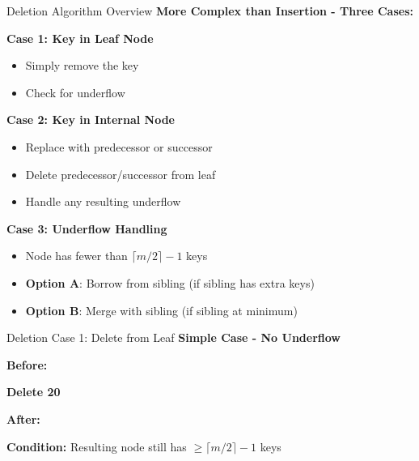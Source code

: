 \documentclass[aspectratio=169]{beamer}
\begin{document}
\begin{frame}{Deletion Algorithm Overview}
  \textbf{More Complex than Insertion - Three Cases:}

  \vspace{0.3cm}
  \textbf{Case 1: Key in Leaf Node}
  \begin{itemize}
    \item Simply remove the key
    \item Check for underflow
  \end{itemize}

  \vspace{0.3cm}
  \textbf{Case 2: Key in Internal Node}
  \begin{itemize}
    \item Replace with predecessor or successor
    \item Delete predecessor/successor from leaf
    \item Handle any resulting underflow
  \end{itemize}

  \vspace{0.3cm}
  \textbf{Case 3: Underflow Handling}
  \begin{itemize}
    \item Node has fewer than $\lceil m/2 \rceil - 1$ keys
    \item \textbf{Option A}: Borrow from sibling (if sibling has extra keys)
    \item \textbf{Option B}: Merge with sibling (if sibling at minimum)
  \end{itemize}
\end{frame}

\begin{frame}{Deletion Case 1: Delete from Leaf}
  \textbf{Simple Case - No Underflow}

  \vspace{0.3cm}
  \textbf{Before:}
  \begin{center}
  \end{center}

  \vspace{0.2cm}
  \textbf{Delete 20}

  \vspace{0.2cm}
  \textbf{After:}
  \begin{center}
  \end{center}

  \vspace{0.3cm}
  \textbf{Condition:} Resulting node still has $\geq \lceil m/2 \rceil - 1$ keys
\end{frame}
\end{document}
